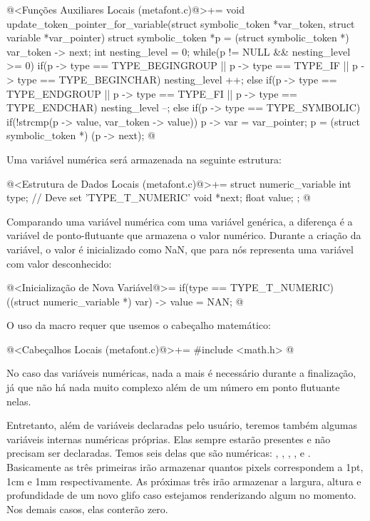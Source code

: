 \iniciocodigo
@<Funções Auxiliares Locais (metafont.c)@>+=
void update_token_pointer_for_variable(struct symbolic_token *var_token,
                                      struct variable *var_pointer){
  struct symbolic_token *p = (struct symbolic_token *) var_token -> next;
  int nesting_level = 0;
  while(p != NULL && nesting_level >= 0){
    if(p -> type == TYPE_BEGINGROUP || p -> type == TYPE_IF ||
       p -> type == TYPE_BEGINCHAR)
      nesting_level ++;
    else if(p -> type == TYPE_ENDGROUP || p -> type == TYPE_FI ||
            p -> type == TYPE_ENDCHAR)
      nesting_level --;
    else if(p -> type == TYPE_SYMBOLIC){
      if(!strcmp(p -> value, var_token -> value)){
        p -> var = var_pointer;
      }
    }
    p = (struct symbolic_token *) (p -> next);
  }
}
@
\fimcodigo


Uma variável numérica será armazenada na seguinte estrutura:

\iniciocodigo
@<Estrutura de Dados Locais (metafont.c)@>+=
struct numeric_variable{
  int type; // Deve set 'TYPE_T_NUMERIC'
  void *next;
  float value;
};
@
\fimcodigo

Comparando uma variável numérica com uma variável genérica, a
diferença é a variável de ponto-flutuante  que
armazena o valor numérico. Durante a criação da variável, o valor é
inicializado como NaN, que para nós representa uma variável com valor
desconhecido:

\iniciocodigo
@<Inicialização de Nova Variável@>=
if(type == TYPE_T_NUMERIC){
  ((struct numeric_variable *) var) -> value = NAN;
}
@
\fimcodigo

O uso da macro  requer que usemos o cabeçalho
matemático:

\iniciocodigo
@<Cabeçalhos Locais (metafont.c)@>+=
#include <math.h>
@
\fimcodigo

No caso das variáveis numéricas, nada a mais é necessário durante a
finalização, já que não há nada muito complexo além de um número em
ponto flutuante nelas.

Entretanto, além de variáveis declaradas pelo usuário, teremos também
algumas variáveis internas numéricas próprias. Elas sempre estarão
presentes e não precisam ser declaradas. Temos seis delas que são
numéricas: , , , ,
 e . Basicamente as três primeiras
irão armazenar quantos pixels correspondem a 1pt, 1cm e 1mm
respectivamente. As próximas três irão armazenar a largura, altura e
profundidade de um novo glifo caso estejamos renderizando algum no
momento. Nos demais casos, elas conterão zero.

